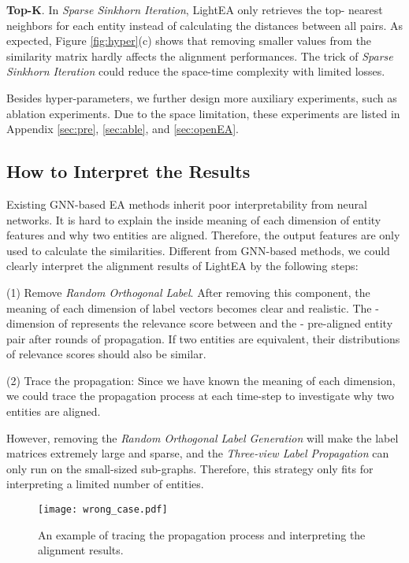 \documentclass[11pt]{article}
\begin{document}
\noindent
\textbf{Top-K}.
In \emph{Sparse Sinkhorn Iteration}, LightEA only retrieves the top- nearest neighbors for each entity instead of calculating the distances between all pairs.
As expected, Figure \ref{fig:hyper}(c) shows that removing smaller values from the similarity matrix hardly affects the alignment performances.
The trick of \emph{Sparse Sinkhorn Iteration} could reduce the space-time complexity with limited losses.

Besides hyper-parameters, we further design more auxiliary experiments, such as ablation experiments.
Due to the space limitation, these experiments are listed in Appendix \ref{sec:pre}, \ref{sec:able}, and \ref{sec:openEA}.

\subsection{How to Interpret the Results}
\label{sec:interpret}
Existing GNN-based EA methods inherit poor interpretability from neural networks.
It is hard to explain the inside meaning of each dimension of entity features and why two entities are aligned.
Therefore, the output features are only used to calculate the similarities.
Different from GNN-based methods, we could clearly interpret the alignment results of LightEA by the following steps:

(1) Remove \emph{Random Orthogonal Label}.
After removing this component, the meaning of each dimension of label vectors becomes clear and realistic.
The - dimension of  represents the relevance score between  and the - pre-aligned entity pair after  rounds of propagation.
If two entities are equivalent, their distributions of relevance scores should also be similar.

(2) Trace the propagation:
Since we have known the meaning of each dimension, we could trace the propagation process at each time-step to investigate why two entities are aligned.

However, removing the \emph{Random Orthogonal Label Generation} will make the label matrices extremely large and sparse, and the \emph{Three-view Label Propagation} can only run on the small-sized sub-graphs.
Therefore, this strategy only fits for interpreting a limited number of entities.

\begin{figure*}[t]
    \centering
    \texttt{[image: wrong\_case.pdf]}
    \caption{An example of tracing the propagation process and interpreting the alignment results.}
    \label{fig:wrong}
\end{figure*}
\end{document}
